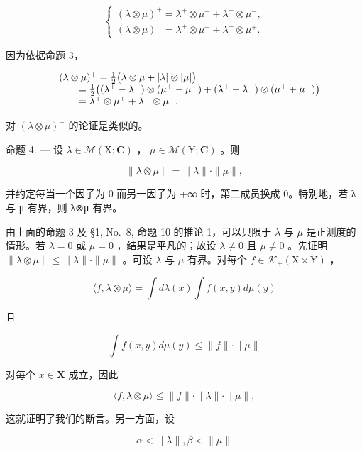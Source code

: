 \[
\left\{ \begin{array}{l} (\lambda \otimes \mu) ^ {+} = \lambda^ {+} \otimes \mu^ {+} + \lambda^ {-} \otimes \mu^ {-}, \\ (\lambda \otimes \mu) ^ {-} = \lambda^ {+} \otimes \mu^ {-} + \lambda^ {-} \otimes \mu^ {+}. \end{array} \right.\tag{9}
\]

因为依据命题 3，

\[
\begin{array}{r l} & {(\lambda \otimes \mu) ^ {+} = \frac {1}{2} \big (\lambda \otimes \mu + | \lambda | \otimes | \mu | \big)} \\ & {\qquad = \frac {1}{2} \big ((\lambda^ {+} - \lambda^ {-}) \otimes (\mu^ {+} - \mu^ {-}) + (\lambda^ {+} + \lambda^ {-}) \otimes (\mu^ {+} + \mu^ {-}) \big)} \\ & {\qquad = \lambda^ {+} \otimes \mu^ {+} + \lambda^ {-} \otimes \mu^ {-}.} \end{array}
\]

对 \((\lambda \otimes \mu)^{-}\) 的论证是类似的。

命题 4. --- 设 \(\lambda \in \mathcal{M}(\mathrm{X};\mathbf{C})\) ， \(\mu \in \mathcal{M}(\mathrm{Y};\mathbf{C})\) 。则

\[
\| \lambda \otimes \mu \| = \| \lambda \| \cdot \| \mu \|,\tag{10}
\]

并约定每当一个因子为 0 而另一因子为 +∞ 时，第二成员换成 0。特别地，若 λ 与 μ 有界，则 λ⊗μ 有界。

由上面的命题 3 及 §1, No.~8, 命题 10 的推论 1，可以只限于 \(\lambda\) 与 \(\mu\) 是正测度的情形。若 \(\lambda = 0\) 或 \(\mu = 0\) ，结果是平凡的；故设 \(\lambda \neq 0\) 且 \(\mu \neq 0\) 。先证明 \(\| \lambda \otimes \mu \| \leqslant \| \lambda \| \cdot \| \mu \|\) 。可设 \(\lambda\) 与 \(\mu\) 有界。对每个 \(f \in \mathcal{K}_+(\mathrm{X} \times \mathrm{Y})\) ，

\[
\langle f, \lambda \otimes \mu \rangle = \int d \lambda (x) \int f (x, y) d \mu (y)
\]

且

\[
\int f (x, y) d \mu (y) \leqslant \| f \| \cdot \| \mu \|
\]

对每个 \(x\in \mathbf{X}\) 成立，因此

\[
\langle f, \lambda \otimes \mu \rangle \leqslant \| f \| \cdot \| \lambda \| \cdot \| \mu \|,
\]

这就证明了我们的断言。另一方面，设

\[
\alpha <   \| \lambda \|, \beta <   \| \mu \|
\]

